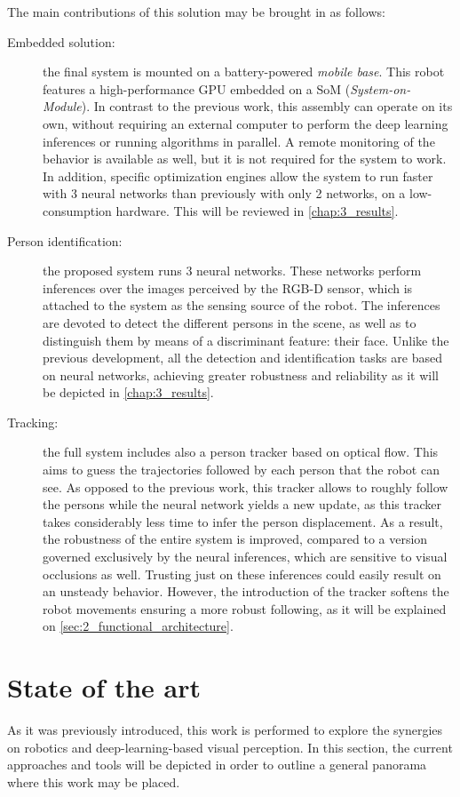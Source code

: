 The main contributions of this solution may be brought in as follows:
\begin{description}
	\item[Embedded solution:] the final system is mounted on a battery-powered \textit{mobile base}. This robot features a high-performance GPU embedded on a SoM (\textit{System-on-Module}). In contrast to the previous work, this assembly can operate on its own, without requiring an external computer to perform the deep learning inferences or running algorithms in parallel. A remote monitoring of the behavior is available as well, but it is not required for the system to work. In addition, specific optimization engines allow the system to run faster with 3 neural networks than previously with only 2 networks, on a low-consumption hardware. This will be reviewed in \autoref{chap:3_results}.

	\item[Person identification:] the proposed system runs 3 neural networks. These networks perform inferences over the images perceived by the RGB-D sensor, which is attached to the system as the sensing source of the robot. The inferences are devoted to detect the different persons in the scene, as well as to distinguish them by means of a discriminant feature: their face. Unlike the previous development, all the detection and identification tasks are based on neural networks, achieving greater robustness and reliability as it will be depicted in \autoref{chap:3_results}.

	\item[Tracking:] the full system includes also a person tracker based on optical flow. This aims to guess the trajectories followed by each person that the robot can see. As opposed to the previous work, this tracker allows to roughly follow the persons while the neural network yields a new update, as this tracker takes considerably less time to infer the person displacement. As a result, the robustness of the entire system is improved, compared to a version governed exclusively by the neural inferences, which are sensitive to visual occlusions as well. Trusting just on these inferences could easily result on an unsteady behavior. However, the introduction of the tracker softens the robot movements ensuring a more robust following, as it will be explained on \autoref{sec:2_functional_architecture}.
\end{description}


	
\section{State of the art}
\label{sec:1_sota}
	As it was previously introduced, this work is performed to explore the synergies on robotics and deep-learning-based visual perception. In this section, the current approaches and tools will be depicted in order to outline a general panorama where this work may be placed.\\
	
